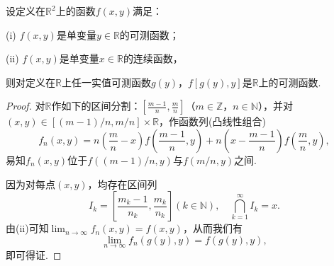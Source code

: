 \documentclass[../../main.tex]{subfiles}
\begin{document}
\begin{theorem}
设定义在\(\mathbb{R}^{2}\)上的函数\(f(x, y)\)满足：

(i) \(f(x, y)\)是单变量\(y \in \mathbb{R}\)的可测函数；

(ii) \(f(x, y)\)是单变量\(x \in \mathbb{R}\)的连续函数，

则对定义在\(\mathbb{R}\)上任一实值可测函数\(g(y)\)，\(f[g(y), y]\)是\(\mathbb{R}\)上的可测函数.
\end{theorem}
\begin{proof}
对\(\mathbb{R}\)作如下的区间分割：\(\left[\frac{m - 1}{n}, \frac{m}{n}\right]\)（\(m \in \mathbb{Z}\)，\(n \in \mathbb{N}\)），并对\((x, y) \in [(m - 1) / n, m / n] \times \mathbb{R}\)，作函数列(凸线性组合)
\[
f_{n}(x, y) = n\left(\frac{m}{n} - x\right)f\left(\frac{m - 1}{n}, y\right) + n\left(x - \frac{m - 1}{n}\right)f\left(\frac{m}{n}, y\right),
\]
易知\(f_{n}(x, y)\)位于\(f((m - 1) / n, y)\)与\(f(m / n, y)\)之间.

因为对每点\((x, y)\)，均存在区间列
\[
I_{k} = \left[\frac{m_{k} - 1}{n_{k}}, \frac{m_{k}}{n_{k}}\right] (k \in \mathbb{N}), \quad \bigcap_{k = 1}^{\infty} I_{k} = x.
\]
由(ii)可知\(\lim_{n \to \infty} f_{n}(x, y) = f(x, y)\)，从而我们有
\[
\lim_{n \to \infty} f_{n}(g(y), y) = f(g(y), y),
\]
即可得证. 
\end{proof}
\end{document}
